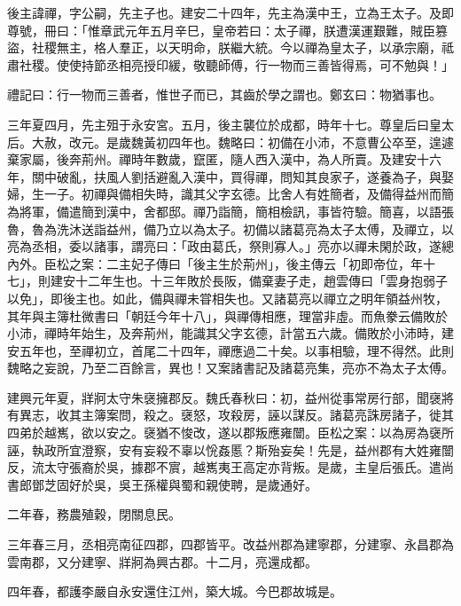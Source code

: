 
\begin{pinyinscope}
後主諱禪，字公嗣，先主子也。建安二十四年，先主為漢中王，立為王太子。及即尊號，冊曰：「惟章武元年五月辛巳，皇帝若曰：太子禪，朕遭漢運艱難，賊臣篡盜，社稷無主，格人羣正，以天明命，朕繼大統。今以禪為皇太子，以承宗廟，祗肅社稷。使使持節丞相亮授印緩，敬聽師傅，行一物而三善皆得焉，可不勉與！」

禮記曰：行一物而三善者，惟世子而已，其齒於學之謂也。鄭玄曰：物猶事也。

三年夏四月，先主殂于永安宮。五月，後主襲位於成都，時年十七。尊皇后曰皇太后。大赦，改元。是歲魏黃初四年也。魏略曰：初備在小沛，不意曹公卒至，遑遽棄家屬，後奔荊州。禪時年數歲，竄匿，隨人西入漢中，為人所賣。及建安十六年，關中破亂，扶風人劉括避亂入漢中，買得禪，問知其良家子，遂養為子，與娶婦，生一子。初禪與備相失時，識其父字玄德。比舍人有姓簡者，及備得益州而簡為將軍，備遣簡到漢中，舍都邸。禪乃詣簡，簡相檢訊，事皆符驗。簡喜，以語張魯，魯為洗沐送詣益州，備乃立以為太子。初備以諸葛亮為太子太傅，及禪立，以亮為丞相，委以諸事，謂亮曰：「政由葛氏，祭則寡人。」亮亦以禪未閑於政，遂總內外。臣松之案：二主妃子傳曰「後主生於荊州」，後主傳云「初即帝位，年十七」，則建安十二年生也。十三年敗於長阪，備棄妻子走，趙雲傳曰「雲身抱弱子以免」，即後主也。如此，備與禪未甞相失也。又諸葛亮以禪立之明年領益州牧，其年與主簿杜微書曰「朝廷今年十八」，與禪傳相應，理當非虛。而魚豢云備敗於小沛，禪時年始生，及奔荊州，能識其父字玄德，計當五六歲。備敗於小沛時，建安五年也，至禪初立，首尾二十四年，禪應過二十矣。以事相驗，理不得然。此則魏略之妄說，乃至二百餘言，異也！又案諸書記及諸葛亮集，亮亦不為太子太傅。

建興元年夏，牂牁太守朱襃擁郡反。魏氏春秋曰：初，益州從事常房行部，聞襃將有異志，收其主簿案問，殺之。襃怒，攻殺房，誣以謀反。諸葛亮誅房諸子，徙其四弟於越嶲，欲以安之。襃猶不悛改，遂以郡叛應雍闓。臣松之案：以為房為襃所誣，執政所宜澄察，安有妄殺不辜以恱姦慝？斯殆妄矣！先是，益州郡有大姓雍闓反，流太守張裔於吳，據郡不賔，越嶲夷王高定亦背叛。是歲，主皇后張氏。遣尚書郎鄧芝固好於吳，吳王孫權與蜀和親使聘，是歲通好。

二年春，務農殖穀，閉關息民。

三年春三月，丞相亮南征四郡，四郡皆平。改益州郡為建寧郡，分建寧、永昌郡為雲南郡，又分建寧、牂牁為興古郡。十二月，亮還成都。

四年春，都護李嚴自永安還住江州，築大城。今巴郡故城是。


\end{pinyinscope}
